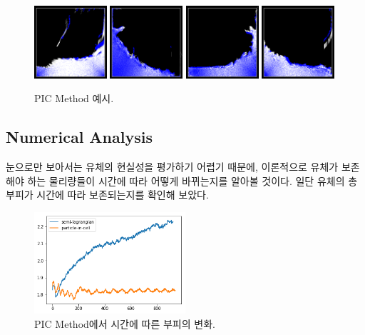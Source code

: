 \documentclass[12pt, A4]{article}
\begin{document}
\begin{figure}[h]
\includegraphics[width=0.24\textwidth]{realism-pic-1}
\includegraphics[width=0.24\textwidth]{realism-pic-2}
\includegraphics[width=0.24\textwidth]{realism-pic-3}
\includegraphics[width=0.24\textwidth]{realism-pic-4}
  \caption{PIC Method 예시.}
  \label{realism-pic}
\end{figure}

\subsection{Numerical Analysis}

눈으로만 보아서는 유체의 현실성을 평가하기 어렵기 때문에, 이론적으로 유체가 보존해야 하는 물리량들이 시간에 따라 어떻게 바뀌는지를 알아볼 것이다. 일단 유체의 총 부피가 시간에 따라 보존되는지를 확인해 보았다.

\begin{figure}[h]
  \centering
  \includegraphics[width=0.5\textwidth]{picflip-volume-graph}
  \caption{PIC Method에서 시간에 따른 부피의 변화.}
  \label{volume-increase-graph}
\end{figure}
\end{document}
